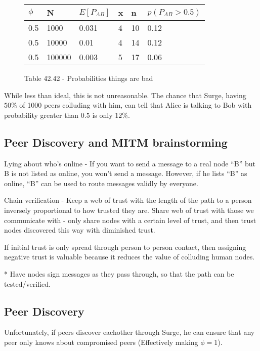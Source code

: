 \documentclass[twocolumn,11pt,english]{paper}
\begin{document}
\begin{figure}[ht]
  \begin{tabular}{| l | l | l | l | l | l |}
    \hline
    $\phi$ & N & $E[P_{AB}]$ & x & n & $p(P_{AB} > 0.5)$ \\\hline
    0.5 & 1000 & 0.031 & 4 & 10 & 0.12\\
    0.5 & 10000 & 0.01 & 4 & 14 & 0.12\\
    0.5 & 100000 & 0.003 & 5 & 17 & 0.06\\
    \hline
  \end{tabular}
  \caption{Table 42.42 - Probabilities things are bad}
\end{figure}

While less than ideal, this is not unreasonable. The chance that Surge, having $50\%$ of 1000 peers colluding with him, can tell that Alice is talking to Bob with probability greater than $0.5$ is only $12\%$. 

\begin{comment}
  TODO: Apply PIR to obtain security guarantees even when $R \subset S$
\end{comment}

\subsection{Peer Discovery and MITM brainstorming}

Lying about who's online - If you want to send a message to a real node ``B'' but B is not listed as online, you won't send a message. However, if he lists ``B'' as online, ``B'' can be used to route messages validly by everyone. 

Chain verification - Keep a web of trust with the length of the path to a person inversely proportional to how trusted they are. Share web of trust with those we communicate with - only share nodes with a certain level of trust, and then trust nodes discovered this way with diminished trust. 

If initial trust is only spread through person to person contact, then assigning negative trust is valuable because it reduces the value of colluding human nodes. 

* Have nodes sign messages as they pass through, so that the path can be tested/verified. 

\subsection{Peer Discovery}
Unfortunately, if peers discover eachother through Surge, he can ensure that any peer only knows about compromised peers (Effectively making $\phi = 1$).
\end{document}
